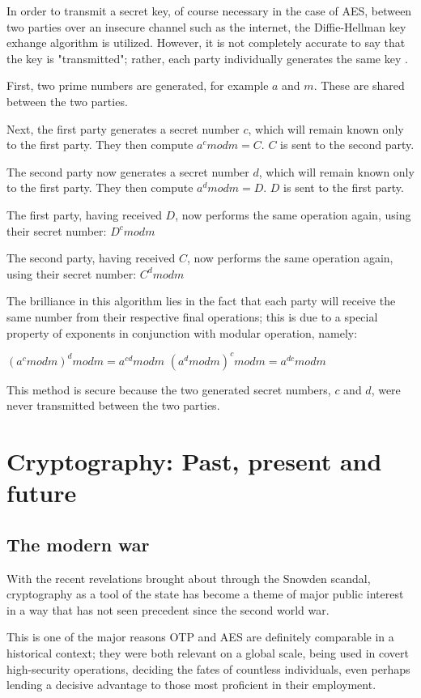 \documentclass[12pt]{report}
\theoremstyle{definition}
\theoremstyle{remark}
\begin{document}
In order to transmit a secret key, of course necessary in the case of AES, between two parties over an insecure channel such as the internet, the Diffie-Hellman key exhange algorithm is utilized. However, it is not completely accurate to say that the key is "transmitted"; rather, each party individually generates the same key \cite{DiffieHellman}.

First, two prime numbers are generated, for example $a$ and $m$. These are shared between the two parties.

Next, the first party generates a secret number $c$, which will remain known only to the first party. They then compute $a^c mod m = C$. $C$ is sent to the second party.

The second party now generates a secret number $d$, which will remain known only to the first party. They then compute $a^d mod m = D$. $D$ is sent to the first party.

The first party, having received $D$, now performs the same operation again, using their secret number:
$D^c mod m$

The second party, having received $C$, now performs the same operation again, using their secret number:
$C^d mod m$

The brilliance in this algorithm lies in the fact that each party will receive the same number from their respective final operations; this is due to a special property of exponents in conjunction with modular operation, namely:

$(a^c mod m)^d mod m = a^{cd} mod m$
$(a^d mod m)^c mod m = a^{dc} mod m$

This method is secure because the two generated secret numbers, $c$ and $d$, were never transmitted between the two parties.

\section{Cryptography: Past, present and future}

\subsection{The modern war}
With the recent revelations brought about through the Snowden scandal\cite{Snowden}, cryptography as a tool of the state has become a theme of major public interest in a way that has not seen precedent since the second world war.

This is one of the major reasons OTP and AES are definitely comparable in a historical context; they were both relevant on a global scale, being used in covert high-security operations, deciding the fates of countless individuals, even perhaps lending a decisive advantage to those most proficient in their employment.
\end{document}
